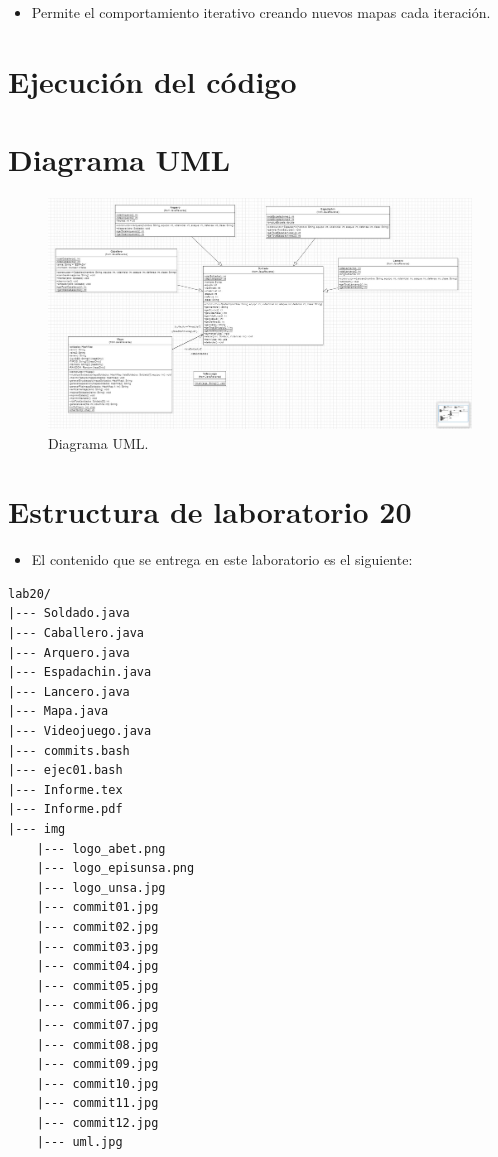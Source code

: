 \documentclass{article}
\newcommand{\itemPracticeNumber}{20}
\begin{document}

\begin{itemize}
	\item Permite el comportamiento iterativo creando nuevos mapas cada iteración.
\end{itemize}
\pagebreak

\section{Ejecución del código}

\pagebreak

\section{Diagrama UML}
\begin{figure}[H]
	\centering
	\includegraphics[width=1\textwidth,keepaspectratio]{img/uml.jpg}
	\caption{Diagrama UML.}
\end{figure}
\pagebreak

\section{Estructura de laboratorio \itemPracticeNumber}
\begin{itemize}
	\item El contenido que se entrega en este laboratorio es el siguiente:
\end{itemize}
\begin{lstlisting}[style=ascii-tree]
lab20/
|--- Soldado.java
|--- Caballero.java
|--- Arquero.java
|--- Espadachin.java
|--- Lancero.java
|--- Mapa.java
|--- Videojuego.java
|--- commits.bash
|--- ejec01.bash
|--- Informe.tex
|--- Informe.pdf
|--- img
	|--- logo_abet.png
	|--- logo_episunsa.png
	|--- logo_unsa.jpg
	|--- commit01.jpg
	|--- commit02.jpg
	|--- commit03.jpg
	|--- commit04.jpg
	|--- commit05.jpg
	|--- commit06.jpg
	|--- commit07.jpg
	|--- commit08.jpg
	|--- commit09.jpg
	|--- commit10.jpg
	|--- commit11.jpg
	|--- commit12.jpg
	|--- uml.jpg
\end{lstlisting}
\pagebreak
\end{document}
